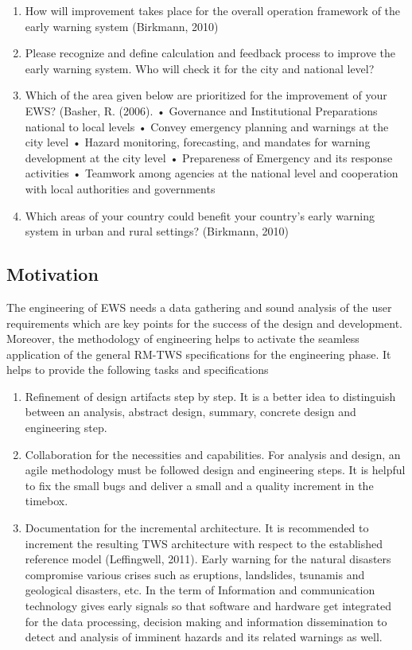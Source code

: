 \begin{enumerate}
\item How will improvement takes place for the overall operation framework of the early warning system (Birkmann, 2010)
\item Please recognize and define calculation and  feedback process to improve the early warning system. Who will check it for the city and national level?
\item Which of the area given below are prioritized for the improvement of your EWS? (Basher, R. (2006).
•	Governance and Institutional Preparations national to local levels
•	Convey emergency planning and warnings at the city level
•	Hazard monitoring, forecasting, and mandates for warning development at the city level
•           Prepareness of Emergency and  its response activities
•	Teamwork among agencies at the national level and cooperation with local authorities and governments
\item Which areas of your country could benefit your country’s early warning system in urban and rural settings? (Birkmann, 2010)
\end{enumerate}
\subsection{ Motivation}
The engineering of EWS needs a  data gathering and sound analysis of the user requirements which are key points  for the success of the design and development.  Moreover, the methodology of engineering  helps to activate the seamless application of the general RM-TWS specifications for the engineering phase. It helps to provide the following tasks and specifications
\begin{enumerate}
\item  Refinement of  design artifacts step by step. It is a better idea to distinguish between an analysis, abstract design, summary, concrete design and engineering step.
\item  Collaboration for the necessities and capabilities. For analysis and design, an agile methodology must be followed design and engineering steps. It is helpful to fix the small bugs and deliver a small and a quality increment in the timebox.
\item  Documentation for the incremental architecture. It is recommended to increment the resulting TWS architecture with respect to the established reference model (Leffingwell, 2011).
Early warning for the natural disasters compromise various crises such as  eruptions, landslides, tsunamis and geological disasters, etc. In the term of Information and communication technology  gives early signals so that software and hardware get integrated  for the data processing, decision making and information dissemination to detect and analysis of imminent hazards and its related warnings as well. 
\end{enumerate}

